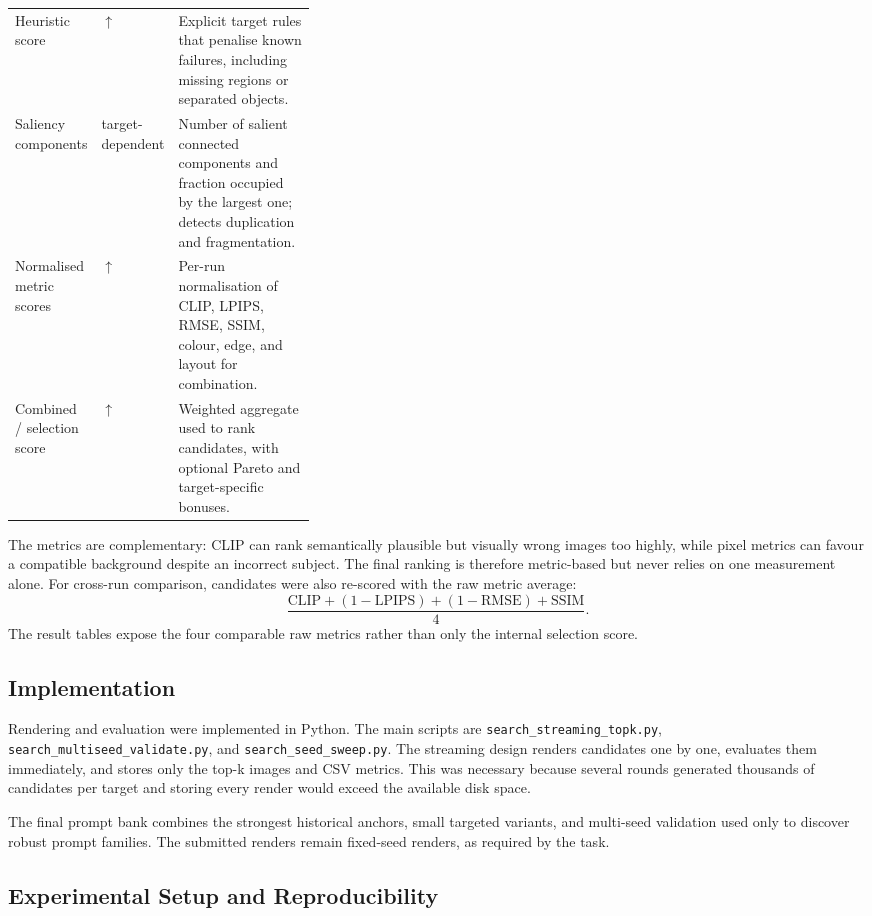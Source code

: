 \documentclass[runningheads]{llncs}
\begin{document}
\begin{table}[H]
\begin{tabularx}{\linewidth}{>{\raggedright\arraybackslash}p{0.25\linewidth}>{\centering\arraybackslash}p{0.10\linewidth}>{\raggedright\arraybackslash}X}
Heuristic score & $\uparrow$ & Explicit target rules that penalise known failures, including missing regions or separated objects. \\
Saliency components & target-dependent & Number of salient connected components and fraction occupied by the largest one; detects duplication and fragmentation. \\
Normalised metric scores & $\uparrow$ & Per-run normalisation of CLIP, LPIPS, RMSE, SSIM, colour, edge, and layout for combination. \\
Combined / selection score & $\uparrow$ & Weighted aggregate used to rank candidates, with optional Pareto and target-specific bonuses. \\
\bottomrule
\end{tabularx}
\end{table}

The metrics are complementary: CLIP can rank semantically plausible but visually wrong images too highly, while pixel metrics can favour a compatible background despite an incorrect subject. The final ranking is therefore metric-based but never relies on one measurement alone. For cross-run comparison, candidates were also re-scored with the raw metric average:
\[
\frac{\mathrm{CLIP} + (1-\mathrm{LPIPS}) + (1-\mathrm{RMSE}) + \mathrm{SSIM}}{4}.
\]
The result tables expose the four comparable raw metrics rather than only the internal selection score.

\subsection{Implementation}

Rendering and evaluation were implemented in Python. The main scripts are \texttt{search\_streaming\_topk.py}, \texttt{search\_multiseed\_validate.py}, and \texttt{search\_seed\_sweep.py}. The streaming design renders candidates one by one, evaluates them immediately, and stores only the top-k images and CSV metrics. This was necessary because several rounds generated thousands of candidates per target and storing every render would exceed the available disk space.

The final prompt bank combines the strongest historical anchors, small targeted variants, and multi-seed validation used only to discover robust prompt families. The submitted renders remain fixed-seed renders, as required by the task.

\subsection{Experimental Setup and Reproducibility}
\end{document}
